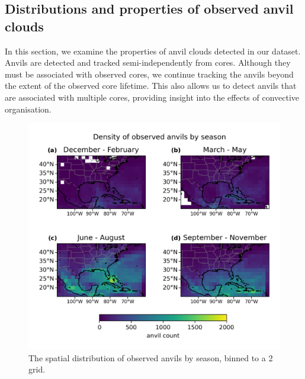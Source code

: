 







\subsection{Distributions and properties of observed anvil clouds} \label{sec:anvil_properties}

In this section, we examine the properties of anvil clouds detected in our dataset.
Anvils are detected and tracked semi-independently from cores.
Although they must be associated with observed cores, we continue tracking the anvils beyond the extent of the observed core lifetime.
This also allows us to detect anvils that are associated with multiple cores, providing insight into the effects of convective organisation.

\begin{figure}[tp]
    \centering
    \includegraphics[width=\textwidth]{figures/chapter2_16.png}
    \caption[
    The spatial distribution of observed anvils by season
    ]{
    The spatial distribution of observed anvils by season, binned to a 2\,\textdegree grid.
    }
    \label{fig:anvil_distribution_map}
\end{figure}

